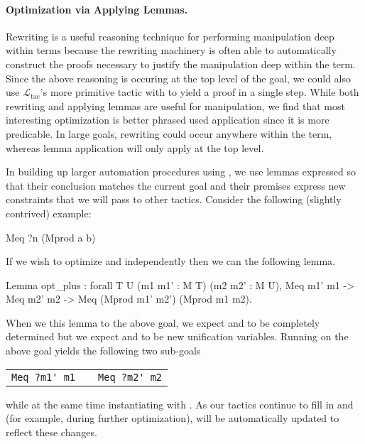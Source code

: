 \documentclass[preprint]{sigplanconf}
\newcommand{\ltac}[0]{\ensuremath{\mathcal{L}_{\mathrm{tac}}}}
\begin{document}
\paragraph{Optimization via Applying Lemmas.}
Rewriting is a useful reasoning technique for performing manipulation deep within terms because the rewriting machinery is often able to automatically construct the proofs necessary to justify the manipulation deep within the term.
Since the above reasoning is occuring at the top level of the goal, we could also use \ltac's more primitive  tactic with  to yield a proof in a single step.
While both rewriting and applying lemmas are useful for manipulation, we find that most interesting optimization is better phrased used application since it is more predicable.
In large goals, rewriting could occur anywhere within the term, whereas lemma application will only apply at the top level.

In building up larger automation procedures using , we use lemmas expressed so that their conclusion matches the current goal and their premises express new constraints that we will pass to other tactics.
Consider the following (slightly contrived) example:
\begin{coq}
Meq ?n (Mprod a b)
\end{coq}
If we wish to optimize  and  independently then we can  the following lemma.
\begin{coq}
Lemma opt_plus : forall {T U} (m1 m1' : M T) (m2 m2' : M U),
  Meq m1' m1 ->
  Meq m2' m2 ->
  Meq (Mprod m1' m2') (Mprod m1 m2).
\end{coq}
When we  this lemma to the above goal, we expect  and  to be completely determined but we expect  and  to be new unification variables.
Running  on the above goal yields the following two sub-goals
\begin{center}
\begin{tabular}{ccc}
\lstinline!Meq ?m1' m1! & \qquad & \lstinline!Meq ?m2' m2! \\
\end{tabular}
\end{center}
while at the same time instantiating  with .
As our tactics continue to fill in  and  (for example, during further optimization),  will be automatically updated to reflect these changes.  
\end{document}
